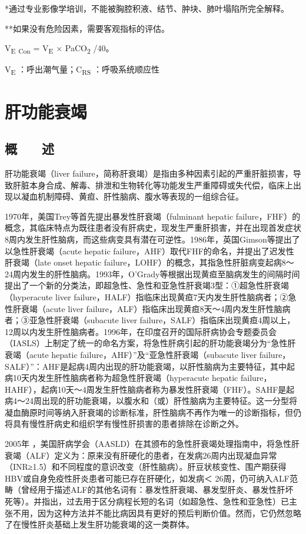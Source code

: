 *通过专业影像学培训，不能被胸腔积液、结节、肿块、肺叶塌陷所完全解释。

**如果没有危险因素，需要客观指标的评估。

V\textsubscript{E} \textsubscript{Con} = V\textsubscript{E} ×
PaCO\textsubscript{2} /40。

V\textsubscript{E} ：呼出潮气量；C\textsubscript{RS} ：呼吸系统顺应性

\protect\hypertarget{text00081.html}{}{}

\chapter{肝功能衰竭}

\section{概　　述}

肝功能衰竭（liver
failure，简称肝衰竭）是指由多种因素引起的严重肝脏损害，导致肝脏本身合成、解毒、排泄和生物转化等功能发生严重障碍或失代偿，临床上出现以凝血机制障碍、黄疸、肝性脑病、腹水等表现的一组综合征。

1970年，美国Trey等首先提出暴发性肝衰竭（fulminant hepatic
failure，FHF）的概念，其临床特点为既往患者没有肝病史，现发生严重肝损害，并在出现首发症状8周内发生肝性脑病，而这些病变具有潜在可逆性。1986年，英国Gimson等提出了以急性肝衰竭（acute
hepatic failure，AHF）取代FHF的命名，并提出了迟发性肝衰竭（late onset
hepatic
failure，LOHF）的概念，其指急性肝脏病变起病8～24周内发生的肝性脑病。1993年，O'Grady等根据出现黄疸至脑病发生的间隔时间提出了一个新的分类法，即超急性、急性和亚急性肝衰竭3型：①超急性肝衰竭（hyperacute
liver
failure，HALF）指临床出现黄疸7天内发生肝性脑病者；②急性肝衰竭（acute
liver
failure，ALF）指临床出现黄疸8天～4周内发生肝性脑病者；③亚急性肝衰竭（subacute
liver
failure，SALF）指临床出现黄疸4周以上，12周以内发生肝性脑病者。1996年，在印度召开的国际肝病协会专题委员会（IASLS）上制定了统一的命名方案，将急性肝病引起的肝功能衰竭分为“急性肝衰竭（acute
hepatic failure，AHF）”及“亚急性肝衰竭（subacute liver
failure，SALF）”：AHF是起病4周内出现的肝功能衰竭，以肝性脑病为主要特征，其中起病10天内发生肝性脑病者称为超急性肝衰竭（hyperacute
hepatic
failure，HAHF），起病10天～4周发生肝性脑病者称为暴发性肝衰竭（FHF）。SAHF是起病4～24周出现的肝功能衰竭，以腹水和（或）肝性脑病为主要特征。这一分型将凝血酶原时间等纳入肝衰竭的诊断标准，肝性脑病不再作为唯一的诊断指标，但仍将具有慢性肝病史和组织学有慢性肝损害的患者排除在诊断之外。

2005年
，美国肝病学会（AASLD）在其颁布的急性肝衰竭处理指南中，将急性肝衰竭（ALF）定义为：原来没有肝硬化的患者，在发病26周内出现凝血异常（INR≥1.5）和不同程度的意识改变（肝性脑病）。肝豆状核变性、围产期获得HBV或自身免疫性肝炎患者可能已存在肝硬化，如发病＜
26周，仍可纳入ALF范畴（曾经用于描述ALF的其他名词有：暴发性肝衰竭、暴发型肝炎、暴发性肝坏死等）。并指出，过去用于区分病程长短的名词（如超急性、急性和亚急性）已主张不用，因为这种方法并不能比病因具有更好的预后判断价值。然而，它仍然忽略了在慢性肝炎基础上发生肝功能衰竭的这一类群体。

